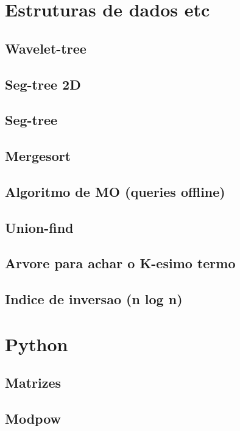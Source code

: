 \section{Estruturas de dados etc}
\subsection{Wavelet-tree}
\raggedbottom
\hrulefill
\subsection{Seg-tree 2D}
\raggedbottom
\hrulefill
\subsection{Seg-tree}
\raggedbottom
\hrulefill
\subsection{Mergesort}
\raggedbottom
\hrulefill
\subsection{Algoritmo de MO (queries offline)}
\raggedbottom
\hrulefill
\subsection{Union-find}
\raggedbottom
\hrulefill
\subsection{Arvore para achar o K-esimo termo}
\raggedbottom
\hrulefill
\subsection{Indice de inversao (n log n)}
\raggedbottom
\hrulefill
\clearpage
\section{Python}
\subsection{Matrizes}
\raggedbottom
\hrulefill
\subsection{Modpow}
\raggedbottom
\hrulefill
\clearpage

